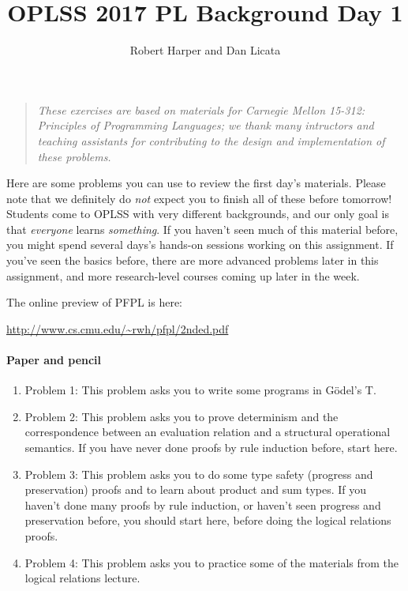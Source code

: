 \documentclass[11pt]{article}
\title{OPLSS 2017 PL Background Day 1}
\author{Robert Harper and Dan Licata}
\date{}
\newcounter{rule}
\begin{document}
\maketitle

\begin{quote} 
\emph{These exercises are based on materials for Carnegie Mellon 15-312:
  Principles of Programming Languages; we thank many intructors and
  teaching assistants for contributing to the design and implementation
  of these problems.}
\end{quote}

Here are some problems you can use to review the first day's materials.
Please note that we definitely do \emph{not} expect you to finish all of
these before tomorrow!  Students come to OPLSS with very different
backgrounds, and our only goal is that \emph{everyone} learns
\emph{something}.  If you haven't seen much of this material before, you
might spend several days's hands-on sessions working on this assignment.
If you've seen the basics before, there are more advanced problems later
in this assignment, and more research-level courses coming up later in
the week.

The online preview of PFPL is here:
\begin{center}
\url{http://www.cs.cmu.edu/~rwh/pfpl/2nded.pdf}
\end{center}


\paragraph{Paper and pencil}

\begin{enumerate}

\item Problem 1: This problem asks you to write some programs in
  G\"odel's T.

\item Problem 2: This problem asks you to prove determinism and the
  correspondence between an evaluation relation and a structural
  operational semantics.  If you have never done proofs by rule
  induction before, start here.

\item Problem 3: This problem asks you to do some type safety (progress
  and preservation) proofs and to learn about product and sum types.  If
  you haven't done many proofs by rule induction, or haven't seen
  progress and preservation before, you should start here, before doing
  the logical relations proofs.  

\item Problem 4: This problem asks you to practice some of the materials
  from the logical relations lecture.
\end{enumerate}
\end{document}
